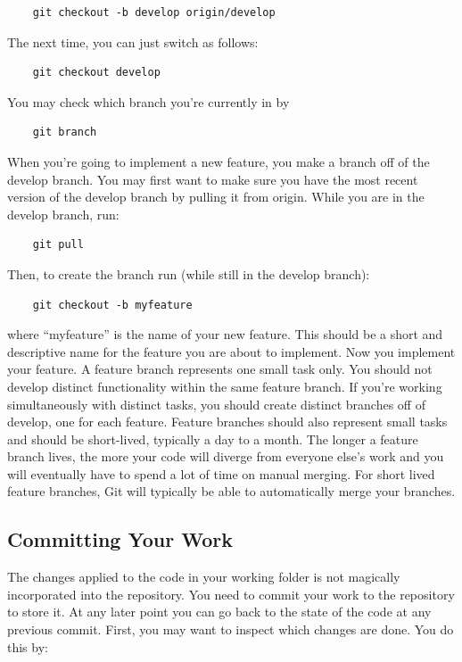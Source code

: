 \documentclass[10pt,a4paper]{article}
\begin{document}
\begin{verbatim}
	git checkout -b develop origin/develop
\end{verbatim}
The next time, you can just switch as follows:

\begin{verbatim}
	git checkout develop
\end{verbatim}
You may check which branch you're currently in by 

\begin{verbatim}
	git branch
\end{verbatim}

When you're going to implement a new feature, you make a branch off of the develop branch. You may first want to make sure you have the most recent version of the develop branch by pulling it from origin. While you are in the develop branch, run:

\begin{verbatim}
	git pull
\end{verbatim}
Then, to create the branch run (while still in the develop branch):

\begin{verbatim}
	git checkout -b myfeature
\end{verbatim}
where ``myfeature'' is the name of your new feature. This should be a short and descriptive name for the feature you are about to implement. Now you implement your feature. A feature branch represents one small task only. You should not develop distinct functionality within the same feature branch. If you're working simultaneously with distinct tasks, you should create distinct branches off of develop, one for each feature. Feature branches should also represent small tasks and should be short-lived, typically a day to a month. The longer a feature branch lives, the more your code will diverge from everyone else's work and you will eventually have to spend a lot of time on manual merging. For short lived feature branches, Git will typically be able to automatically merge your branches.

\subsection{Committing Your Work}
The changes applied to the code in your working folder is not magically incorporated into the repository. You need to commit your work to the repository to store it. At any later point you can go back to the state of the code at any previous commit. First, you may want to inspect which changes are done. You do this by:
\end{document}
